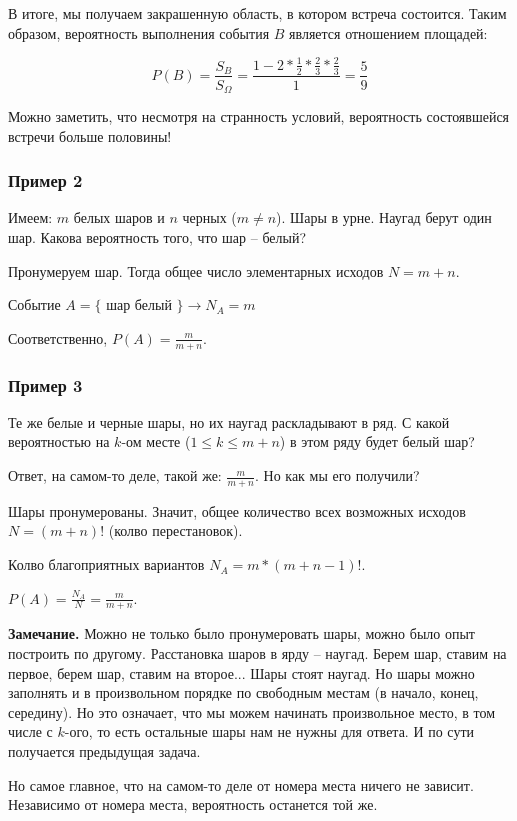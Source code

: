 \documentclass{article}
\begin{document}
В итоге, мы получаем закрашенную область, в котором встреча состоится. Таким образом, вероятность выполнения события $B$ является отношением площадей:

$$P(B) = \frac{S_B}{S_{\Omega}} = \frac{1 - 2 * \frac{1}{2} * \frac{2}{3} * \frac{2}{3}}{1} = \frac{5}{9} $$

Можно заметить, что несмотря на странность условий, вероятность состоявшейся встречи больше половины!

\subsubsection{Пример 2}

Имеем: $m$ белых шаров и $n$ черных ($m \neq n$). Шары в урне.
Наугад берут один шар. Какова вероятность того, что шар -- белый?

Пронумеруем шар. Тогда общее число элементарных исходов $N = m + n$.

Событие $A = \{$ шар белый $\} \rightarrow N_A = m$

Соответственно, $P(A) = \frac{m}{m + n}$.

\subsubsection{Пример 3}

Те же белые и черные шары, но их наугад раскладывают в ряд. С какой вероятностью на $k$-ом месте ($1 \leq k \leq m + n$) в этом ряду будет белый шар?

Ответ, на самом-то деле, такой же: $\frac{m}{m + n}$. Но как мы его получили?

Шары пронумерованы. Значит, общее количество всех возможных исходов $N = (m + n)!$ (колво перестановок).

Колво благоприятных вариантов $N_A = m * (m + n - 1)!$.

$P(A) = \frac{N_A}{N} = \frac{m}{m + n}$.

\textbf{Замечание.} Можно не только было пронумеровать шары, можно было опыт построить по другому. Расстановка шаров в ярду -- наугад. Берем шар, ставим на первое, берем шар, ставим на второе... Шары стоят наугад. Но шары можно заполнять и в произвольном порядке по свободным местам (в начало, конец, середину). Но это означает, что мы можем начинать произвольное место, в том числе с $k$-ого, то есть остальные шары нам не нужны для ответа. И по сути получается предыдущая задача.

Но самое главное, что на самом-то деле от номера места ничего не зависит. Независимо от номера места, вероятность останется той же.
\end{document}
